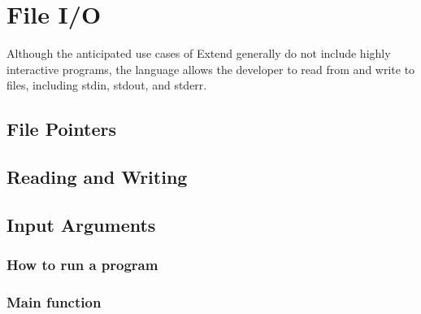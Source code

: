 \section{File I/O}
\label{sec:IO}
Although the anticipated use cases of Extend generally do not include highly interactive programs, the language allows the developer to read from and write to files, including stdin, stdout, and stderr.
\subsection{File Pointers}
\subsection{Reading and Writing}
\subsection{Input Arguments}
\subsubsection{How to run a program}
\subsubsection{Main function}
